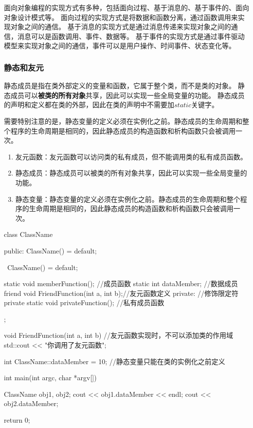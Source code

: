 
面向对象编程的实现方式有多种，包括面向过程、基于消息的、基于事件的、面向对象设计模式等。
面向过程的实现方式是将数据和函数分离，通过函数调用来实现对象之间的通信。
基于消息的实现方式是通过消息传递来实现对象之间的通信，消息可以是函数调用、事件、数据等。
基于事件的实现方式是通过事件驱动模型来实现对象之间的通信，事件可以是用户操作、时间事件、状态变化等。

\subsubsection{静态和友元}

静态成员是指在类外部定义的变量和函数，它属于整个类，而不是类的对象。
静态成员可以\textbf{被类的所有对象}共享，因此可以实现一些全局变量的功能。
静态成员的声明和定义都在类的外部，因此在类的声明中不需要加$static$关键字。

需要特别注意的是，静态变量的定义必须在实例化之前。静态成员的生命周期和整个程序的生命周期是相同的，因此静态成员的构造函数和析构函数只会被调用一次。
\begin{enumerate}
    \item 友元函数：友元函数可以访问类的私有成员，但不能调用类的私有成员函数。
    \item 静态成员：静态成员可以被类的所有对象共享，因此可以实现一些全局变量的功能。
    \item 静态变量：静态变量的定义必须在实例化之前。静态成员的生命周期和整个程序的生命周期是相同的，因此静态成员的构造函数和析构函数只会被调用一次。
\end{enumerate}

\begin{tcode}
class ClassName {
    public:
        ClassName() = default;
    
        ~ClassName() = default;
    
        static void memberFunction();   //成员函数
        static int dataMember;          //数据成员
        friend void FriendFunction(int a, int b);//友元函数定义
    private:                            //修饰限定符private
        static void privateFunction();  //私有成员函数
};
        
void FriendFunction(int a, int b){ //友元函数实现时，不可以添加类的作用域
    std::cout << "你调用了友元函数";
}
        
int ClassName::dataMember = 10; //静态变量只能在类的实例化之前定义
        
int main(int argc, char *argv[]) {
    ClassName obj1, obj2;
    cout << obj1.dataMember << endl;
    cout << obj2.dataMember;
        
    return 0;
}

\end{tcode}

